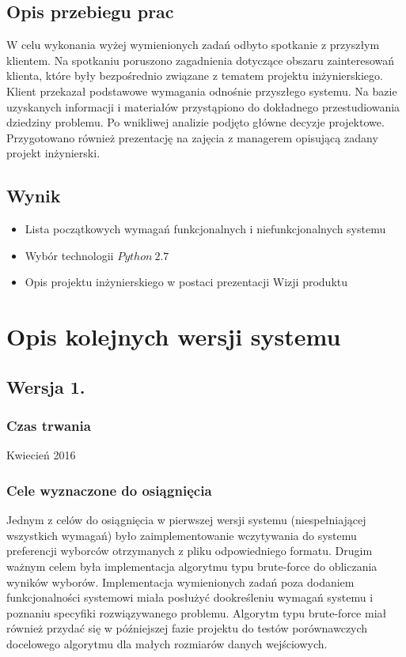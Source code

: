 \documentclass[pdflatex,11pt]{../aghdoc_version2}
\begin{document}
\subsection{Opis przebiegu prac}
W celu wykonania wyżej wymienionych zadań odbyto spotkanie z przyszłym klientem. Na
spotkaniu poruszono zagadnienia dotyczące obszaru zainteresowań klienta, które były
bezpośrednio związane z tematem projektu inżynierskiego. Klient przekazał podstawowe wymagania odnośnie przyszłego systemu. Na bazie uzyskanych informacji i materiałów
przystąpiono do dokładnego przestudiowania dziedziny problemu. Po wnikliwej analizie
podjęto główne decyzje projektowe. Przygotowano również prezentację na zajęcia z
managerem opisującą zadany projekt inżynierski.
\subsection{Wynik}
\begin{itemize}
\item Lista początkowych wymagań funkcjonalnych i niefunkcjonalnych systemu
\item Wybór technologii $Python \ 2.7$
\item Opis projektu inżynierskiego w postaci prezentacji Wizji produktu
\end{itemize}

\section{Opis kolejnych wersji systemu}
\subsection{Wersja 1.}
\subsubsection{Czas trwania}
Kwiecień 2016
\subsubsection{Cele wyznaczone do osiągnięcia}
Jednym z celów do osiągnięcia w pierwszej wersji systemu (niespełniającej wszystkich
wymagań) było zaimplementowanie wczytywania do systemu preferencji wyborców
otrzymanych z pliku odpowiedniego formatu. Drugim ważnym celem była implementacja
algorytmu typu brute-force do obliczania wyników wyborów. Implementacja wymienionych
zadań poza dodaniem funkcjonalności systemowi miała posłużyć dookreśleniu wymagań
systemu i poznaniu specyfiki rozwiązywanego problemu. Algorytm typu brute-force miał
również przydać się w późniejszej fazie projektu do testów porównawczych docelowego
algorytmu dla małych rozmiarów danych wejściowych.
\end{document}
